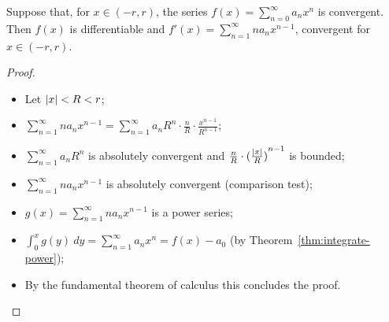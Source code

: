 \begin{theorem}%
  \label{thm:differentiate-power}
  Suppose that, for \(x\in (-r,r)\), the series  \(f(x) = \sum_{n=0}^{\infty} a_n x^n\) is convergent.
  Then \(f(x)\) is differentiable and \(f'(x) =\sum_{n=1}^{\infty} n a_n x^{n-1}\), convergent for \(x\in (-r,r)\).
\end{theorem}

\begin{proof}
  \begin{itemize}
    \item Let \(\left|x\right|<R<r\);
    \item
          \(\sum_{n=1}^{\infty} n a_n x^{n-1}    = \sum_{n=1}^{\infty} a_n R^{n} \cdot \frac{n}{R} \cdot \frac{{x}^{n-1}}{R^{n-1}}\);
    \item \(\sum_{n=1}^{\infty} a_n R^n\) is absolutely convergent and \(  \frac{n}{R}  \cdot {( \frac{\left|x\right|}{R} )}^{n-1}\) is bounded;
    \item \(\sum_{n=1}^{\infty} n a_n x^{n-1} \) is absolutely convergent
          (comparison test);
    \item \(g(x) =\sum_{n=1}^{\infty} n a_n x^{n-1} \) is a power series;
    \item \(\int_0^x g(y) \ dy = \sum_{n=1}^{\infty} a_n x^{n} = f(x) - a_0\) (by Theorem~\ref{thm:integrate-power});
    \item By the fundamental theorem of calculus this concludes the proof. \qedhere
  \end{itemize}
\end{proof}











